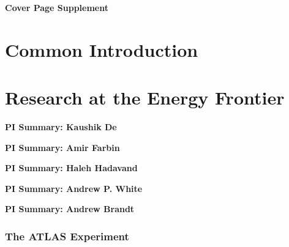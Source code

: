 \documentclass[11pt]{article}
\def\overhead#1{\part{#1}}
\def\onehead#1{\section{#1}}
\def\centerhead#1{
	\begin{center}
	\Large\textbf{#1}
	\end{center}}
\begin{document}
\pagestyle{empty}
\baselineskip=23pt
\normalsize

\noindent

%


\newpage

\centerhead{Cover Page Supplement}

\newpage

\pagestyle{plain}
\setcounter{page}{1}


\overhead{Common Introduction}

\newpage


\overhead{Research at the Energy Frontier}



\centerhead{PI Summary: Kaushik De}


\centerhead{PI Summary: Amir Farbin}


\centerhead{PI Summary: Haleh Hadavand}


\centerhead{PI Summary: Andrew P. White}


\centerhead{PI Summary: Andrew Brandt}



\onehead{The ATLAS Experiment}
\end{document}
